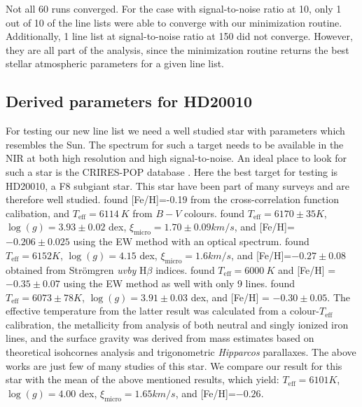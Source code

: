 \documentclass{aa}
\begin{document}
Not all 60 runs converged. For the case with signal-to-noise ratio at
10, only 1 out of 10 of the line lists were able to converge with our
minimization routine. Additionally, 1 line list at signal-to-noise ratio
at 150 did not converge. However, they are all part of the analysis,
since the minimization routine returns the best stellar atmospheric
parameters for a given line list.




\subsection{Derived parameters for HD20010}
\label{sec:derived_parameters_of_hd20010}

For testing our new line list we need a well studied star with
parameters which resembles the Sun. The spectrum for such a target
needs to be available in the NIR at both high resolution and high
signal-to-noise. An ideal place to look for such a star is the
CRIRES-POP database \citep{Lebzelter2012}. Here the best target for
testing is HD20010, a F8 subgiant star. This star have been part of
many surveys and are therefore well studied. \cite{Mortier2013} found
[Fe/H]=-0.19 from the cross-correlation function calibation, and
$T_\mathrm{eff}=\SI{6114}{K}$ from $B-V$ colours. \cite{Gonzalez2010}
found $T_\mathrm{eff} = 6170\pm35\si{K}$, $\log(g) = 3.93\pm0.02$ dex,
$\xi_\mathrm{micro} = 1.70\pm0.09\si{km/s}$, and [Fe/H]=$-0.206\pm0.025$
using the EW method with an optical spectrum. \cite{Balachandran1990}
found $T_\mathrm{eff} = 6152\si{K}$, $\log(g) = 4.15$ dex,
$\xi_\mathrm{micro} = 1.6\si{km/s}$, and [Fe/H]=$-0.27\pm0.08$ obtained
from Str\"{o}mgren \emph{uvby} H$\beta$ indices. \cite{Favata1997} found
$T_\mathrm{eff}=\SI{6000}{K}$ and [Fe/H] = $-0.35\pm0.07$ using the EW
method as well with only 9 lines. \cite{Ramirez2012} found $T_\mathrm{eff}
= 6073\pm78\si{K}$, $\log(g) = 3.91\pm0.03$ dex, and [Fe/H] =
$-0.30\pm0.05$. The effective temperature from the latter result was
calculated from a colour-$T_\mathrm{eff}$ calibration, the metallicity
from analysis of both neutral and singly ionized iron lines, and the
surface gravity was derived from mass estimates based on theoretical
isohcornes analysis and trigonometric \emph{Hipparcos} parallaxes. The
above works are just few of many studies of this star. We compare our
result for this star with the mean of the above mentioned results,
which yield: $T_\mathrm{eff} = 6101\si{K}$, $\log(g) = 4.00$ dex,
$\xi_\mathrm{micro} = 1.65\si{km/s}$, and [Fe/H]=$-0.26$.
\end{document}
